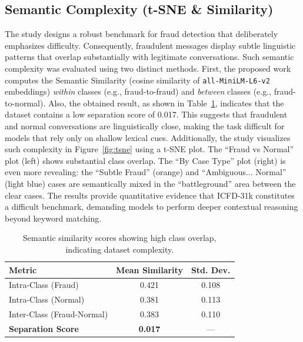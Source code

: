 \documentclass{article}
\begin{document}
\subsection{Semantic Complexity (t-SNE \& Similarity)}

The study designs a robust benchmark for fraud detection that deliberately emphasizes difficulty. Consequently, fraudulent messages display subtle linguistic patterns that overlap substantially with legitimate conversations. Such semantic complexity was evaluated using two distinct methods. First, the proposed work computes the Semantic Similarity (cosine similarity of \texttt{all-MiniLM-L6-v2} embeddings) \emph{within} classes (e.g., fraud-to-fraud) and \emph{between} classes (e.g., fraud-to-normal). Also, the obtained result, as shown in Table~\ref{tab:semantic}, indicates that the dataset contains a low separation score of 0.017. This suggests that fraudulent and normal conversations are linguistically close, making the task difficult for models that rely only on shallow lexical cues. Additionally, the study visualizes such complexity in Figure~\ref{fig:tsne} using a t-SNE \cite{maaten2008visualizing} plot. The ``Fraud vs Normal'' plot (left) shows substantial class overlap. The ``By Case Type'' plot (right) is even more revealing: the ``Subtle Fraud'' (orange) and ``Ambiguous... Normal'' (light blue) cases are semantically mixed in the ``battleground'' area between the clear cases. The results provide quantitative evidence that ICFD-31k constitutes a difficult benchmark, demanding models to perform deeper contextual reasoning beyond keyword matching.

\begin{table}[t]
\centering
\caption{Semantic similarity scores showing high class overlap, indicating dataset complexity.}
\label{tab:semantic}
\begin{tabular}{@{}lcc@{}}
\toprule
Metric & Mean Similarity & Std. Dev. \\ \midrule
Intra-Class (Fraud) & 0.421 & 0.108 \\
Intra-Class (Normal) & 0.381 & 0.113 \\
Inter-Class (Fraud-Normal) & 0.383 & 0.110 \\
\textbf{Separation Score} & \textbf{0.017} & --- \\ \bottomrule
\end{tabular}
\end{table}
\end{document}
